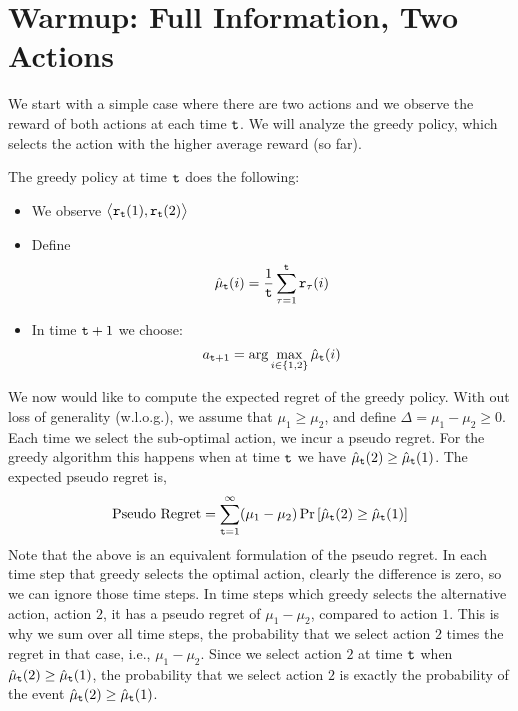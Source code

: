 \section{Warmup: Full Information, Two Actions }

We start with a simple case where there are two actions and we
observe the reward of both actions at each time ${\tt t}$. We will analyze
the greedy policy, which selects the action with the higher average
reward (so far).

The greedy policy at time ${\tt t}$ does the following:
\begin{itemize}
\item We observe $\big\langle {\tt r}_{{\tt t}}(1),{\tt r}_{{\tt t}}(2)\big\rangle$
\item Define
\[
\hat{\mu}_{{\tt t}}(i)=\frac{1}{{\tt t}} \sum_{\tau=1}^{{\tt t}}{\tt r}_{\tau}(i)
\]
\item In time ${\tt t}+1$ we choose:
\[
a_{{\tt t}+1}=\arg\max_{i\in\{1,2\}}\hat{\mu}_{{\tt t}}(i)
\]
\end{itemize}


We now would like to compute the expected regret of the greedy policy. 
With out loss of generality (w.l.o.g.), we assume that $\mu_{1}\ge\mu_{2}$, and define
$\Delta=\mu_{1}-\mu_{2}\ge0$. Each time we select the sub-optimal action, we incur a pseudo regret. For the greedy algorithm this happens when at time ${\tt t}$ we have $\hat{\mu}_{{\tt t}}(2)\ge \hat{\mu}_{{\tt t}}(1)$. The expected pseudo regret is,
\[
\text{Pseudo Regret}= \sum_{{\tt t}=1}^{\infty}(\mu_{1}-\mu_{2})
\Pr\left[\hat{\mu}_{{\tt t}}(2)\ge \hat{\mu}_{{\tt t}}(1)\right]
\]
Note that the above is an equivalent formulation of the pseudo regret. In each time step that greedy selects the optimal action, clearly the difference is zero, so we can ignore those time steps. In time steps which greedy selects the alternative action, action $2$, it has a pseudo regret of $\mu_1-\mu_2$, compared to action $1$. This is why we sum over all time steps, the probability that we select action $2$ times the regret in that case, i.e., $\mu_1-\mu_2$. Since we select action $2$ at time ${\tt t}$ when $\hat{\mu}_{{\tt t}}(2)\ge \hat{\mu}_{{\tt t}}(1)$, the probability that we select action $2$ is  exactly the probability of the event $\hat{\mu}_{{\tt t}}(2)\ge \hat{\mu}_{{\tt t}}(1)$.

